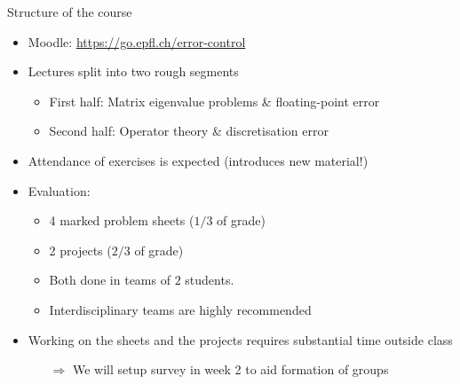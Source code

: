 \begin{frame}{Structure of the course}
    \begin{itemize}
        \item \alert{Moodle:} \url{https://go.epfl.ch/error-control}
        \vspace{0.5em}
        \item Lectures split into two rough segments
            \begin{itemize}
                \vspace{-0.3em}
                \item \alert{First half:} Matrix eigenvalue problems \& floating-point error
                \vspace{-0.3em}
                \item \alert{Second half:} Operator theory \& discretisation error
            \end{itemize}
        \vspace{0.5em}
        \item Attendance of exercises is \alert{expected} \textcolor{grey5}{(introduces new material!)}
        \vspace{0.5em}
        \item Evaluation:
            \begin{itemize}
                \vspace{-0.3em}
                \item 4 marked problem sheets \textcolor{grey5}{($1/3$ of grade)}
                \vspace{-0.3em}
                \item 2 projects \textcolor{grey5}{($2/3$ of grade)}
                \vspace{-0.3em}
                \item Both done in \alert{teams of $2$ students}.
                \vspace{-0.3em}
                \item Interdisciplinary teams are highly recommended
            \end{itemize}
        \vspace{0.5em}
        \item Working on the sheets and the projects
            \alert{requires substantial time outside class}
            \begin{itemize}
                \vspace{-0.3em}
            \item[$\Rightarrow$] We will setup \alert{survey} in week 2 to \alert{aid formation of groups}
            \end{itemize}
    \end{itemize}
\end{frame}

